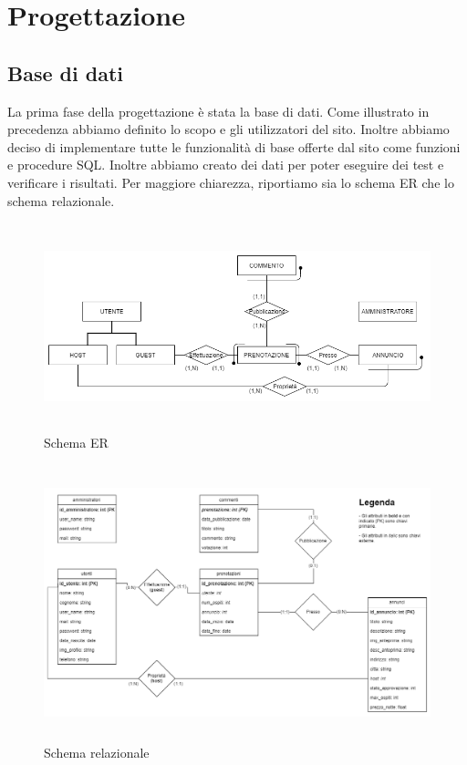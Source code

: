\documentclass[1_relazione.tex]{subfiles}
\begin{document}
\section{Progettazione}

\subsection{Base di dati}
La prima fase della progettazione è stata la base di dati. Come illustrato in precedenza abbiamo definito lo scopo e gli utilizzatori del sito. Inoltre abbiamo deciso di implementare tutte le funzionalità di base offerte dal sito come funzioni e procedure SQL. Inoltre abbiamo creato dei dati per poter eseguire dei test e verificare i risultati. Per maggiore chiarezza, riportiamo sia lo schema ER che lo schema relazionale.

\begin{figure}[h]
\centering
\includegraphics[width=14cm, height=6cm]{immagini/schema_ER-2}
\caption{Schema ER }
\end{figure}

\begin{figure}[h]
\centering
\includegraphics[width=14cm, height=8cm]{immagini/schema_relazionale-2}
\caption{Schema relazionale }
\end{figure}
\end{document}
